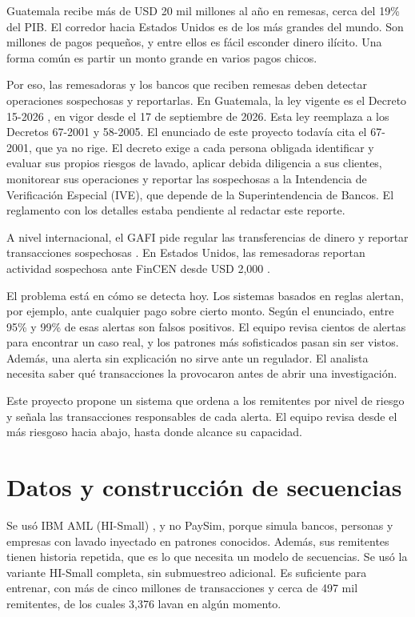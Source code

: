 \documentclass[11pt]{article}
\begin{document}
Guatemala recibe más de USD 20 mil millones al año en remesas, cerca del 19\% del PIB. El corredor hacia Estados Unidos es de los más grandes del mundo. Son millones de pagos pequeños, y entre ellos es fácil esconder dinero ilícito. Una forma común es partir un monto grande en varios pagos chicos.

Por eso, las remesadoras y los bancos que reciben remesas deben detectar operaciones sospechosas y reportarlas. En Guatemala, la ley vigente es el Decreto 15-2026 \cite{decreto152026}, en vigor desde el 17 de septiembre de 2026. Esta ley reemplaza a los Decretos 67-2001 y 58-2005. El enunciado de este proyecto todavía cita el 67-2001, que ya no rige. El decreto exige a cada persona obligada identificar y evaluar sus propios riesgos de lavado, aplicar debida diligencia a sus clientes, monitorear sus operaciones y reportar las sospechosas a la Intendencia de Verificación Especial (IVE), que depende de la Superintendencia de Bancos. El reglamento con los detalles estaba pendiente al redactar este reporte.

A nivel internacional, el GAFI pide regular las transferencias de dinero y reportar transacciones sospechosas \cite{fatf2012}. En Estados Unidos, las remesadoras reportan actividad sospechosa ante FinCEN desde USD 2,000 \cite{fincen1022}.

El problema está en cómo se detecta hoy. Los sistemas basados en reglas alertan, por ejemplo, ante cualquier pago sobre cierto monto. Según el enunciado, entre 95\% y 99\% de esas alertas son falsos positivos. El equipo revisa cientos de alertas para encontrar un caso real, y los patrones más sofisticados pasan sin ser vistos. Además, una alerta sin explicación no sirve ante un regulador. El analista necesita saber qué transacciones la provocaron antes de abrir una investigación.

Este proyecto propone un sistema que ordena a los remitentes por nivel de riesgo y señala las transacciones responsables de cada alerta. El equipo revisa desde el más riesgoso hacia abajo, hasta donde alcance su capacidad.

\section{Datos y construcción de secuencias}

Se usó IBM AML (HI-Small) \cite{altman2023}, y no PaySim, porque simula bancos, personas y empresas con lavado inyectado en patrones conocidos. Además, sus remitentes tienen historia repetida, que es lo que necesita un modelo de secuencias. Se usó la variante HI-Small completa, sin submuestreo adicional. Es suficiente para entrenar, con más de cinco millones de transacciones y cerca de 497 mil remitentes, de los cuales 3,376 lavan en algún momento.
\end{document}
